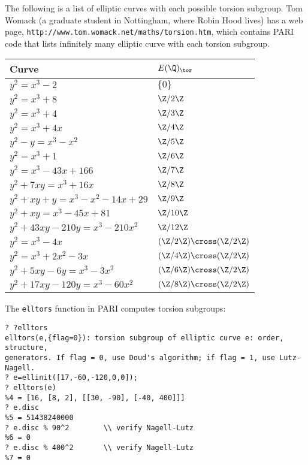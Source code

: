 \documentclass[11pt]{report}
\begin{document}
\begin{example}
  The following is a list of elliptic curves with each possible torsion
  subgroup. Tom Womack (a graduate student in Nottingham, where Robin
  Hood lives) has a web page, {\tt http://www.tom.womack.net/maths/torsion.htm},
  which contains PARI code that lists infinitely many elliptic
  curve with each torsion subgroup.
  \begin{center}
    \begin{tabular}{|l|l|}\hline
      Curve                               & $E(\Q)_{\tor}$            \\\hline
      $y^2 = x^3 - 2$                     & $\{0\}$                   \\
      $y^2 = x^3 + 8$                     & $\Z/2\Z$                  \\
      $y^2 = x^3 + 4$                     & $\Z/3\Z$                  \\
      $y^2 = x^3 + 4x$                    & $\Z/4\Z$                  \\
      $y^2 -y = x^3 - x^2$                & $\Z/5\Z$                  \\
      $y^2 = x^3 + 1$                     & $\Z/6\Z$                  \\
      $y^2 = x^3 -43x + 166$              & $\Z/7\Z$                  \\
      $y^2 + 7xy = x^3 +16x$              & $\Z/8\Z$                  \\
      $y^2 + xy +y = x^3 - x^2 - 14x +29$ & $\Z/9\Z$                  \\
      $y^2 + xy = x^3 -45x + 81$          & $\Z/10\Z$                 \\
      $y^2 + 43xy - 210y = x^3 - 210x^2$  & $\Z/12\Z$                 \\
      $y^2 = x^3 - 4x$                    & $(\Z/2\Z)\cross(\Z/2\Z)$  \\
      $y^2 = x^3 + 2x^2 - 3x$             & $(\Z/4\Z)\cross(\Z/2\Z)$  \\
      $y^2 + 5xy - 6y = x^3 - 3x^2$       & $(\Z/6\Z)\cross(\Z/2\Z)$  \\
      $y^2 + 17xy - 120y = x^3 -60x^2$    & $(\Z/8\Z)\cross (\Z/2\Z)$ \\
      \hline
    \end{tabular}
  \end{center}
\end{example}

The {\tt elltors} function in PARI computes torsion subgroups:
\begin{verbatim}
? ?elltors
elltors(e,{flag=0}): torsion subgroup of elliptic curve e: order, structure, 
generators. If flag = 0, use Doud's algorithm; if flag = 1, use Lutz-Nagell.
? e=ellinit([17,-60,-120,0,0]);
? elltors(e)
%4 = [16, [8, 2], [[30, -90], [-40, 400]]]
? e.disc
%5 = 51438240000
? e.disc % 90^2        \\ verify Nagell-Lutz
%6 = 0
? e.disc % 400^2       \\ verify Nagell-Lutz
%7 = 0
\end{verbatim}
\end{document}

